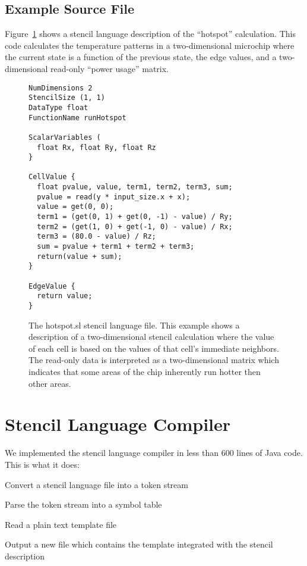 \documentclass{styles/sig-alternate}
\begin{document}
\subsection{Example Source File}

Figure~\ref{fig:hotspot} shows a stencil language description of the
``hotspot'' calculation.  This code calculates the temperature
patterns in a two-dimensional microchip where the current state is a
function of the previous state, the edge values, and a two-dimensional
read-only ``power usage'' matrix.

\begin{figure}
\begin{small}
\begin{verbatim}
NumDimensions 2
StencilSize (1, 1)
DataType float
FunctionName runHotspot

ScalarVariables (
  float Rx, float Ry, float Rz
}

CellValue {
  float pvalue, value, term1, term2, term3, sum;
  pvalue = read(y * input_size.x + x);
  value = get(0, 0);
  term1 = (get(0, 1) + get(0, -1) - value) / Ry;
  term2 = (get(1, 0) + get(-1, 0) - value) / Rx;
  term3 = (80.0 - value) / Rz;
  sum = pvalue + term1 + term2 + term3;
  return(value + sum);
}

EdgeValue {
  return value;
}
\end{verbatim}
\end{small}
\caption{The hotspot.sl stencil language file.  This example
  shows a description of a two-dimensional stencil calculation where
  the value of each cell is based on the values of that cell's
  immediate neighbors.  The read-only data is interpreted as a
  two-dimensional matrix which indicates that some areas of the chip
  inherently run hotter then other areas.}
\label{fig:hotspot} 
\end{figure}

\section{Stencil Language Compiler}

We implemented the stencil language compiler in less than 600 lines of
Java code.  This is what it does:
\begin{enumerate*}
\item Convert a stencil language file into a token stream
\item Parse the token stream into a symbol table
\item Read a plain text template file
\item Output a new file which contains the template integrated with
  the stencil description
\end{enumerate*}
\end{document}
